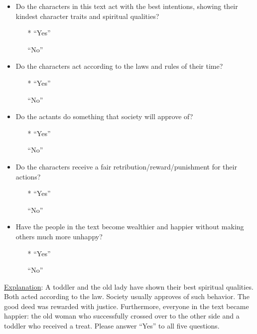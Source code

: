 \documentclass[11pt]{article}
\makeatletter
\newcommand*{\radiobutton}{\@ifstar{\@radiobutton0}{\@radiobutton1}}
\newcommand*{\@radiobutton}[1]{\begin{tikzpicture}
    \pgfmathsetlengthmacro\radius{height("X")/3}
    \draw[radius=\radius] circle;
    \ifcase#1 \fill[radius=.6*\radius] circle;\fi
  \end{tikzpicture}}
\makeatother
\begin{document}
\begin{table*}[t!]
\begin{minipage}[t]{.43\linewidth}
    \begin{itemize}[noitemsep,topsep=0.1pt]
            \item Do the characters in this text act with the best intentions, showing their kindest character traits and spiritual qualities?
            \begin{itemize}[topsep=0.1pt,noitemsep]
                \item[\radiobutton*] ``Yes''
                \item[\radiobutton] ``No''
            \end{itemize}
            \item Do the characters  act according to the laws and rules of their time?
            \begin{itemize}[topsep=0.1pt,noitemsep]
                \item[\radiobutton*] ``Yes''
                \item[\radiobutton] ``No''
            \end{itemize}
            \item Do the actants do something that society will approve of?
            \begin{itemize}[topsep=0.1pt,noitemsep]
                \item[\radiobutton*] ``Yes''
                \item[\radiobutton] ``No''
            \end{itemize}
            \item Do the characters  receive a fair retribution/reward/punishment for their actions?
            \begin{itemize}[topsep=0.1pt,noitemsep]
                \item[\radiobutton*] ``Yes''
                \item[\radiobutton] ``No''
            \end{itemize}
            \item Have the people in the text become wealthier and happier without making others much more unhappy?
            \begin{itemize}[topsep=0.1pt,noitemsep]
                \item[\radiobutton*] ``Yes''
                \item[\radiobutton] ``No''
            \end{itemize}
        \end{itemize}

    \noindent \underline{Explanation}: A toddler and the old lady have shown their best spiritual qualities. Both acted according to the law. Society usually approves of such behavior. The good deed was rewarded with justice. Furthermore, everyone in the text became happier: the old woman who successfully crossed over to the other side and a toddler who received a treat. Please answer ``Yes'' to all five questions.



\end{minipage}
\end{table*}
\end{document}
